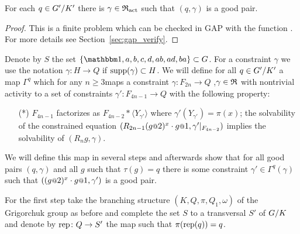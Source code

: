 \documentclass[a4paper,11pt]{amsart}
\begin{document}
\begin{lem} \label{lem:existsGoodGamma}
 For each $q\in{G'/K'}$ there is $\gamma\in \mathfrak{R}_{\operatorname{act}}$ such that $(q,\gamma)$ is a 
 good pair.
\end{lem}
\begin{proof}
 This is a finite problem which can be checked in GAP with the function .
 For more details see Section~\ref{sec:gap_verify}.
\end{proof}

Denote by $S$ the set $\{\id,a,b,c,d,ab,ad,ba\}\subset G$.
For a constraint $\gamma$ we use the notation $\gamma: H \to Q$ if $\operatorname{{supp}}(\gamma) \subset H$.
We will define for all $q\in {G'/K'}$ a map $\Gamma^q$ which for any $n \ge 3$maps a constraint
$\gamma\colon F_{2n} \to Q$ ,$\gamma\in \mathfrak{R}$ with nontrivial activity to a set of constraints $\gamma'\colon F_{4n-1}\to Q$
with the following property:
\begin{itemize}
  \item[(*)]
  $F_{4n-1}$ factorizes as $F_{4n-2} * \langle Y_{\gamma'} \rangle$ where $\gamma'(Y_{\gamma'})=\pi(x)$;
  the solvability of the constrained equation $(R_{2n-1} (g\at{2})^x \cdot g\at{1},\gamma'|_{F_{4n-2}})$
  implies the solvability of $(R_ng,\gamma)$.
 \end{itemize}

 We will define this map in several steps and afterwards show that for all good 
 pairs $(q,\gamma)$ and all $g$ such that $\tau(g)=q$ there is some constraint 
 $\gamma' \in \Gamma^q(\gamma)$ such that $((g\at{2})^x \cdot g\at{1},\gamma')$ is a good pair.
 
 For the first step take the branching structure $(K,Q,\pi,Q_1,\omega)$ of the 
 Grigorchuk group as before and complete the set $S$ to a transversal $S'$ 
 of ${G/K}$ and denote by $\operatorname{rep}\colon Q\to S'$  the map such that 
 $\pi(\operatorname{rep}(q)) = q$.
 
\end{document}
